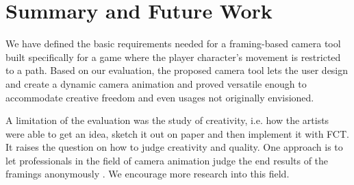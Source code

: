 \section{Summary and Future Work}
We have defined the basic requirements needed for a framing-based camera tool built specifically for a game where the player character's movement is restricted to a  path. Based on our evaluation, the proposed camera tool lets the user design and create a dynamic camera animation and proved versatile enough to accommodate creative freedom and even usages not originally envisioned. 

A limitation of the evaluation was the study of creativity, i.e. how the artists were able to get an idea, sketch it out on paper and then implement it with FCT. It raises the question on how to judge creativity and quality. One approach is to let professionals in the field of camera animation judge the end results of the framings anonymously \cite{sadeghi_artist_2010}. We encourage more research into this field.